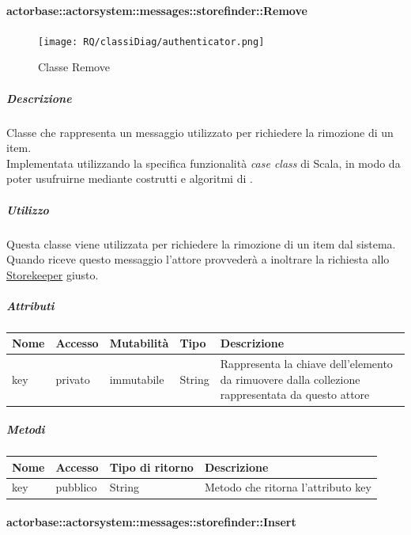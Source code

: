 \documentclass{scalatekids-article}
\begin{document}
\paragraph{actorbase::actorsystem::messages::storefinder::Remove}
\label{sec:actorbase::actorsystem::messages::storefinder::Remove}

\begin{figure}[H]
  \begin{center}
    \texttt{[image: RQ/classiDiag/authenticator.png]}
    \caption{Classe Remove}
  \end{center}
\end{figure}

\subparagraph{Descrizione}
Classe che rappresenta un messaggio utilizzato per richiedere la rimozione di un item.\\Implementata utilizzando la specifica funzionalità \textit{case class} di Scala,
in modo da poter usufruirne mediante costrutti e algoritmi di
.

\subparagraph{Utilizzo}
Questa classe viene utilizzata per richiedere la rimozione di un item dal
sistema.\\Quando riceve questo messaggio l'attore provvederà a inoltrare la
richiesta allo \hyperref[sec:actorbase::actorsystem::actors::storekeeper::Storekeeper]{Storekeeper}
giusto.

\subparagraph{Attributi}
\begin{tabular}{| p{2cm} | p{1.5cm} | p{2cm} | p{3cm} | p{8.5cm} |}
  \hline
  Nome & Accesso & Mutabilità & Tipo & Descrizione\\
  \hline
  key & privato & immutabile & String & Rappresenta la chiave dell'elemento da rimuovere dalla collezione rappresentata da questo attore\\
  \hline
\end{tabular}

\subparagraph{Metodi}
\begin{tabular}{| l | l | l | l |}
  \hline
  Nome & Accesso & Tipo di ritorno & Descrizione\\
  \hline
  key & pubblico & String & Metodo che ritorna l'attributo key\\
  \hline
\end{tabular}

\paragraph{actorbase::actorsystem::messages::storefinder::Insert}
\label{sec:actorbase::actorsystem::messages::storefinder::Insert}
\end{document}
